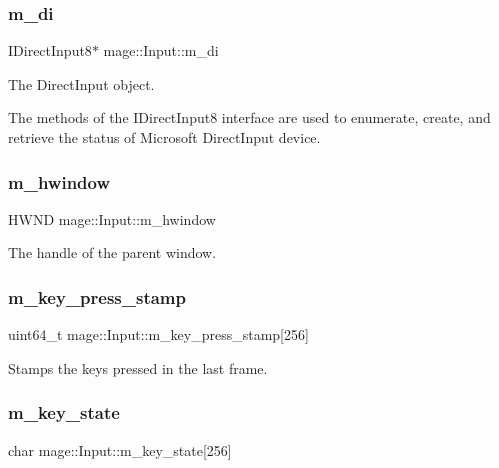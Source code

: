 \subsubsection{\texorpdfstring{m\+\_\+di}{m\_di}}
{\footnotesize\ttfamily I\+Direct\+Input8$\ast$ mage\+::\+Input\+::m\+\_\+di\hspace{0.3cm}{\ttfamily [private]}}

The Direct\+Input object.

The methods of the I\+Direct\+Input8 interface are used to enumerate, create, and retrieve the status of Microsoft Direct\+Input device. \hypertarget{classmage_1_1_input_a1b33f0e27c18870391633b1883c3f615}{}\label{classmage_1_1_input_a1b33f0e27c18870391633b1883c3f615} 
\subsubsection{\texorpdfstring{m\+\_\+hwindow}{m\_hwindow}}
{\footnotesize\ttfamily H\+W\+ND mage\+::\+Input\+::m\+\_\+hwindow\hspace{0.3cm}{\ttfamily [private]}}

The handle of the parent window. \hypertarget{classmage_1_1_input_a383109c45d2a0b0edeb482de8b53d53b}{}\label{classmage_1_1_input_a383109c45d2a0b0edeb482de8b53d53b} 
\subsubsection{\texorpdfstring{m\+\_\+key\+\_\+press\+\_\+stamp}{m\_key\_press\_stamp}}
{\footnotesize\ttfamily uint64\+\_\+t mage\+::\+Input\+::m\+\_\+key\+\_\+press\+\_\+stamp\mbox{[}256\mbox{]}\hspace{0.3cm}{\ttfamily [private]}}

Stamps the keys pressed in the last frame. \hypertarget{classmage_1_1_input_aa0f92d1f06d3f952611ccdb69c9da1d4}{}\label{classmage_1_1_input_aa0f92d1f06d3f952611ccdb69c9da1d4} 
\subsubsection{\texorpdfstring{m\+\_\+key\+\_\+state}{m\_key\_state}}
{\footnotesize\ttfamily char mage\+::\+Input\+::m\+\_\+key\+\_\+state\mbox{[}256\mbox{]}\hspace{0.3cm}{\ttfamily [private]}}

